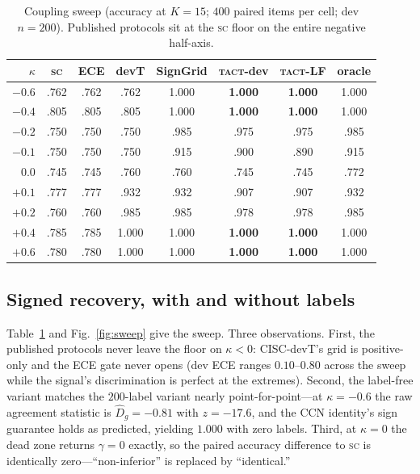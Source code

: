 \documentclass{article}
\newcommand{\Dhat}{\widehat{D}}
\newcommand{\SC}{\textsc{sc}}
\newcommand{\TACT}{\textsc{tact}}
\begin{document}
\begin{table}[t]
\centering
\caption{Coupling sweep (accuracy at $K{=}15$; $400$ paired items per cell; dev $n{=}200$). Published protocols sit at the \SC{} floor on the entire negative half-axis.}
\label{tab:sweep}
\setlength{\tabcolsep}{3.4pt}
\begin{tabular}{r cc cc cc c}
\toprule
$\kappa$ & \SC & ECE & devT & SignGrid & \textbf{\TACT-dev} & \textbf{\TACT-LF} & oracle\\
\midrule
$-0.6$ & .762 & .762 & .762 & 1.000 & \textbf{1.000} & \textbf{1.000} & 1.000\\
$-0.4$ & .805 & .805 & .805 & 1.000 & \textbf{1.000} & \textbf{1.000} & 1.000\\
$-0.2$ & .750 & .750 & .750 & .985 & .975 & .975 & .985\\
$-0.1$ & .750 & .750 & .750 & .915 & .900 & .890 & .915\\
$0.0$  & .745 & .745 & .760 & .760 & .745 & .745 & .772\\
$+0.1$ & .777 & .777 & .932 & .932 & .907 & .907 & .932\\
$+0.2$ & .760 & .760 & .985 & .985 & .978 & .978 & .985\\
$+0.4$ & .785 & .785 & 1.000 & 1.000 & \textbf{1.000} & \textbf{1.000} & 1.000\\
$+0.6$ & .780 & .780 & 1.000 & 1.000 & \textbf{1.000} & \textbf{1.000} & 1.000\\
\bottomrule
\end{tabular}
\end{table}
\subsection{Signed recovery, with and without labels}
Table~\ref{tab:sweep} and Fig.~\ref{fig:sweep} give the sweep. Three observations. First, the published protocols never leave the floor on $\kappa<0$: CISC-devT's grid is positive-only and the ECE gate never opens (dev ECE ranges $0.10$--$0.80$ across the sweep while the signal's discrimination is perfect at the extremes). Second, the label-free variant matches the $200$-label variant nearly point-for-point---at $\kappa{=}{-}0.6$ the raw agreement statistic is $\Dhat_g=-0.81$ with $z=-17.6$, and the CCN identity's sign guarantee holds as predicted, yielding $1.000$ with zero labels. Third, at $\kappa=0$ the dead zone returns $\gamma=0$ exactly, so the paired accuracy difference to \SC{} is identically zero---``non-inferior'' is replaced by ``identical.''
\end{document}
